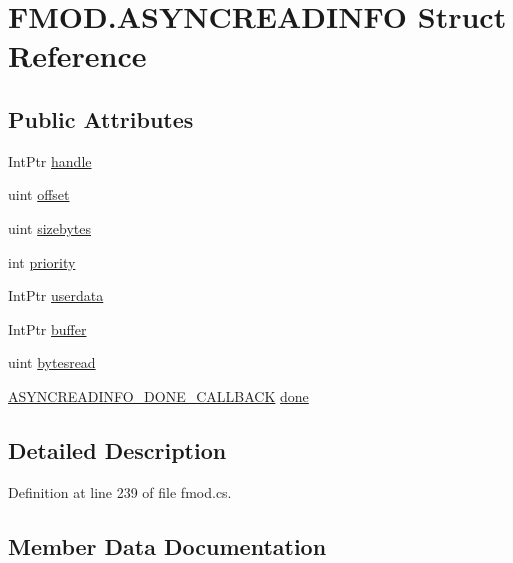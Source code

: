\hypertarget{struct_f_m_o_d_1_1_a_s_y_n_c_r_e_a_d_i_n_f_o}{}\section{F\+M\+O\+D.\+A\+S\+Y\+N\+C\+R\+E\+A\+D\+I\+N\+FO Struct Reference}
\label{struct_f_m_o_d_1_1_a_s_y_n_c_r_e_a_d_i_n_f_o}
\subsection*{Public Attributes}
\begin{DoxyCompactItemize}
\item 
Int\+Ptr \hyperlink{struct_f_m_o_d_1_1_a_s_y_n_c_r_e_a_d_i_n_f_o_a77f1315797c3a17e9d39437eadad1084}{handle}
\item 
uint \hyperlink{struct_f_m_o_d_1_1_a_s_y_n_c_r_e_a_d_i_n_f_o_af2ec9c12953c65982a0b7a6ced08c11b}{offset}
\item 
uint \hyperlink{struct_f_m_o_d_1_1_a_s_y_n_c_r_e_a_d_i_n_f_o_a72045670ec1cdcdfe56a779ec2a9f5f8}{sizebytes}
\item 
int \hyperlink{struct_f_m_o_d_1_1_a_s_y_n_c_r_e_a_d_i_n_f_o_aaddd10538e28e408ab2f9fab07038313}{priority}
\item 
Int\+Ptr \hyperlink{struct_f_m_o_d_1_1_a_s_y_n_c_r_e_a_d_i_n_f_o_ad99c7774b25ef56436d17cf7a60f9814}{userdata}
\item 
Int\+Ptr \hyperlink{struct_f_m_o_d_1_1_a_s_y_n_c_r_e_a_d_i_n_f_o_a53412cadf5d1fcab135861561c2bf67a}{buffer}
\item 
uint \hyperlink{struct_f_m_o_d_1_1_a_s_y_n_c_r_e_a_d_i_n_f_o_a7df85bb85cda25e4c091a9b4f34d747a}{bytesread}
\item 
\hyperlink{namespace_f_m_o_d_aa16fd74612ccbefd30aaf6c72316a08f}{A\+S\+Y\+N\+C\+R\+E\+A\+D\+I\+N\+F\+O\+\_\+\+D\+O\+N\+E\+\_\+\+C\+A\+L\+L\+B\+A\+CK} \hyperlink{struct_f_m_o_d_1_1_a_s_y_n_c_r_e_a_d_i_n_f_o_aefdaea57f2877cce579eab3c373711c6}{done}
\end{DoxyCompactItemize}


\subsection{Detailed Description}


Definition at line 239 of file fmod.\+cs.



\subsection{Member Data Documentation}
\mbox{\label{struct_f_m_o_d_1_1_a_s_y_n_c_r_e_a_d_i_n_f_o_a53412cadf5d1fcab135861561c2bf67a}} 
